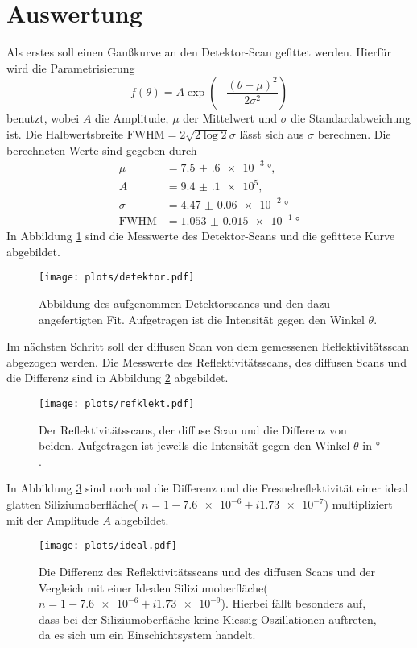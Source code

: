 \section{Auswertung}
Als erstes soll einen Gaußkurve an den Detektor-Scan gefittet werden.
Hierfür wird die Parametrisierung
\begin{equation*}
    f(\theta) = A\exp\left( - \frac{( \theta - \mu)^2}{2\sigma^2} \right)
\end{equation*} 
benutzt, wobei $A$ die Amplitude, $\mu$ der Mittelwert und $\sigma$ die Standardabweichung ist.
Die Halbwertsbreite $\text{FWHM} = 2\sqrt{2\log2}\sigma$ lässt sich aus $\sigma$ berechnen.
Die berechneten Werte sind gegeben durch
\begin{align*}
    \mu &= \SI{7.5(6)e-3}{\degree}, \\
    A &= \num{9.4(1)e5}, \\
    \sigma &= \SI{4.47(6)e-2}{\degree} \\
    \text{FWHM} &= \SI{1.053(15)e-1}{\degree}
\end{align*}
In Abbildung \ref{fig:Detektor} sind die Messwerte des Detektor-Scans und die gefittete Kurve abgebildet.
\begin{figure}
    \centering
    \texttt{[image: plots/detektor.pdf]}
    \caption{Abbildung des aufgenommen Detektorscanes und den dazu angefertigten Fit. Aufgetragen ist die Intensität gegen den Winkel $\theta$.}
    \label{fig:Detektor}
\end{figure}
Im nächsten Schritt soll der diffusen Scan von dem gemessenen Reflektivitätsscan abgezogen werden. Die Messwerte des Reflektivitätsscans, des diffusen Scans und die Differenz sind in Abbildung \ref{fig:reflekt} abgebildet.
\begin{figure}
    \centering 
    \texttt{[image: plots/refklekt.pdf]}
    \caption{Der Reflektivitätsscans, der diffuse Scan und die Differenz von beiden. Aufgetragen ist jeweils die Intensität gegen den Winkel $\theta $ in $\si{\degree}$. }
    \label{fig:reflekt}
\end{figure}
In Abbildung \ref{fig:silicium} sind nochmal die Differenz und die Fresnelreflektivität einer ideal glatten Siliziumoberfläche( $n = 1- \num{7.6e-6} + i\num{1.73e-7} $\cite{kiessig}) multipliziert mit der Amplitude $A$ abgebildet.
\begin{figure}
    \centering 
    \texttt{[image: plots/ideal.pdf]}
    \caption{Die Differenz des Reflektivitätsscans und des diffusen Scans und der Vergleich mit einer Idealen Siliziumoberfläche( $n = 1- \num{7.6e-6} + i\num{1.73e-9} $). Hierbei fällt besonders auf, dass bei der Siliziumoberfläche keine Kiessig-Oszillationen  auftreten, da es sich um ein Einschichtsystem handelt.   }
    \label{fig:silicium}
\end{figure}
